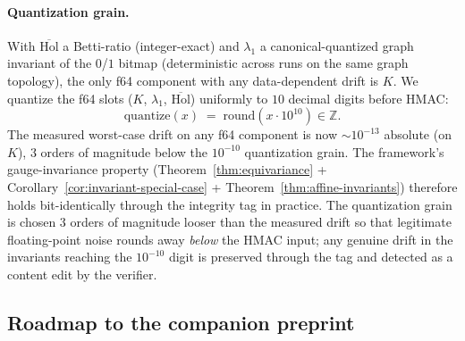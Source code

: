 \documentclass[11pt,letterpaper]{article}
\begin{document}
\paragraph{Quantization grain.}
With $\overline{\mathrm{Hol}}$ a Betti-ratio (integer-exact) and
$\lambda_1$ a canonical-quantized graph invariant of the $0$/$1$
bitmap (deterministic across runs on the same graph topology),
the only f64 component with any data-dependent drift is $K$. We
quantize the f64 slots ($K$, $\lambda_1$, $\overline{\mathrm{Hol}}$)
uniformly to $10$ decimal digits before HMAC:
\[
\mathrm{quantize}(x) \;=\; \mathrm{round}(x \cdot 10^{10}) \in \mathbb{Z}.
\]
The measured worst-case drift on any f64 component is now $\sim 10^{-13}$
absolute (on $K$), $3$ orders of magnitude below the $10^{-10}$
quantization grain. The framework's gauge-invariance
property (Theorem~\ref{thm:equivariance} +
Corollary~\ref{cor:invariant-special-case} +
Theorem~\ref{thm:affine-invariants}) therefore holds bit-identically
through the integrity tag in practice. The quantization grain is
chosen $3$ orders of magnitude looser than the measured drift so
that legitimate floating-point noise rounds away \emph{below} the
HMAC input; any genuine drift in the invariants reaching the
$10^{-10}$ digit is preserved through the tag and detected as a
content edit by the verifier.

\subsection{Roadmap to the companion preprint}
\label{sec:gauge-invariance:implications}
\end{document}
